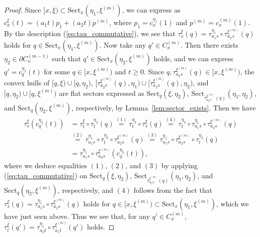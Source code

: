 \documentclass[12pt]{amsart}
\numberwithin{equation}{section}
\theoremstyle{plain}
\theoremstyle{definition}
\theoremstyle{remark}
\newcommand{\xxi}[1]{\xi^{(#1)}}
\newcommand{\ray}[1]{[#1)}
\newcommand{\cc}[2]{c_{#1}^{#2}}
\newcommand{\trans}[2]{\tau_{#1}^{#2}}
\newcommand{\sect}[3][]{\mathrm{Sect}_{#1}(#2,#3)}
\newcommand{\cone}[2][]{C_{#1}^{(#2)}}
\begin{document}
\begin{proof}
 Since $\ray{x,\xi} \subset \sect[x]{\eta_1}{\xxi{m}}$, 
 we can express as $\cc{x}{\xi}(t)=(a_1t)p_1 + (a_2t)p^{(m)}$, where
 $p_1=\cc{x}{\eta_1}(1)$ and $p^{(m)}=\cc{x}{(m)}(1)$. 
 By the description (\ref{eq:tau_commutative}), 
 we see that 
 $\trans{s}{\xi}(q)=\trans{a_1 s}{\eta_1}\circ \trans{a_2s}{\xxi{m}}(q)$
 holds for $q \in \sect[x]{\eta_1}{\xxi{m}}$. 
 Now take any $q' \in \cone[x]{m}$. Then there exists
 $\eta_2 \in \partial \cone[x]{m-1}$ such that 
 $q' \in \sect[x]{\eta_2}{\xxi{m}}$ holds, and we can express
 $q'=\cc{q}{\eta_2}(t)$ for some $q \in \ray{x,\xxi{m}}$ and 
 $t\geq 0$.
 Since $q, \trans{a_2s}{\xxi{m}}(q)\in \ray{x,\xxi{m}}$, 
 the convex hulls of $\ray{q,\xi}\cup \ray{q,\eta_2}$, 
 $\ray{\trans{a_2s}{\xxi{m}}(q),\eta_1}\cup
 \ray{\trans{a_2s}{\xxi{m}}(q),\eta_2}$, 
 and $\ray{q,\eta_2}\cup \ray{q,\xxi{m}}$
 are flat sectors expressed as $\sect[q]{\xi}{\eta_2}$, 
 $\sect[\trans{a_2s}{\xxi{m}}(q)]{\eta_1}{\eta_2}$, and
 $\sect[q]{\eta_2}{\xxi{m}}$, respectively, by
 Lemma~\ref{lem:sector_exists}.
 Then we have
 \begin{equation*}
 \begin{split}
   \trans{s}{\xi}(\cc{q}{\eta_2}(t)) & 
   = \trans{t}{\xi}\circ \trans{t}{\eta_2}(q)   
   \overset{(1)}{=}\trans{t}{\eta_2} \circ \trans{s}{\xi}(q)
  \overset{(4)}{=} \trans{t}{\eta_2} \circ \trans{a_1s}{\eta_1} \circ
  \trans{a_2s}{\xxi{m}}(q) \\
  & \overset{(2)}{=} \trans{a_1s}{\eta_1}\circ \trans{t}{\eta_2} \circ
      \trans{a_2s}{\xxi{m}}(q) 
   \overset{(3)}{=} \trans{a_1s}{\eta_1}\circ
  \trans{a_2s}{\xxi{m}}\circ \trans{t}{\eta_2}(q)  \\
  & = \trans{a_1s}{\eta_1}\circ \trans{a_2s}{\xxi{m}}
  (\cc{q}{\eta_2}(t)), 
 \end{split}
 \end{equation*}
 where we deduce equalities $(1)$, $(2)$, and $(3)$ 
 by applying (\ref{eq:tau_commutative})
 on $\sect[q]{\xi}{\eta_2}$, 
 $\sect[\trans{a_2s}{\xxi{m}}(q)]{\eta_1}{\eta_2}$, and 
 $\sect[q]{\eta_2}{\xxi{m}}$,  respectively, and $(4)$ follows
 from the fact that 
 $\trans{s}{\xi}(q)=\trans{a_1 s}{\eta_1}\circ 
 \trans{a_2 s}{\xxi{m}}(q)$
 holds for $q \in \ray{x,\xxi{m}}\subset 
 \sect[x]{\eta_1}{\xxi{m}}$, 
 which we have just seen above. 
 Thus we see that, for any $q' \in \cone[x]{m}$, 
 $\trans{t}{\xi}(q')=\trans{a_2t}{\eta_1}\circ\trans{a_1t}{\xxi{m}}(q')$
 holds. 


\end{proof}
\end{document}
